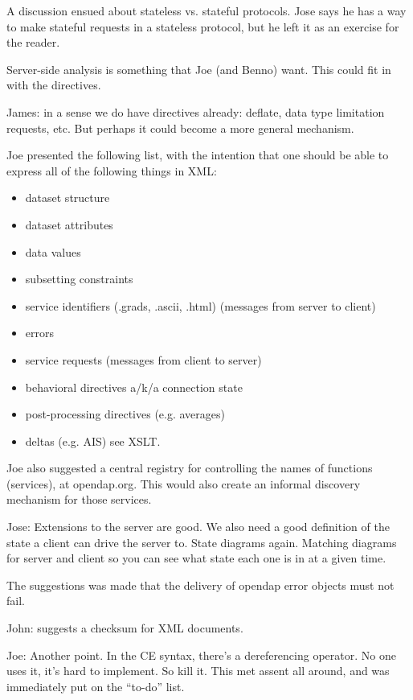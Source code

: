 A discussion ensued about stateless vs. stateful protocols.  Jose says
he has a way to make stateful requests in a stateless protocol, but he
left it as an exercise for the reader.

Server-side analysis is something that Joe (and Benno) want.  This
could fit in with the directives.

James: in a sense we do have directives already: deflate, data type
limitation requests, etc.  But perhaps it could become a more general
mechanism. 

Joe presented the following list, with the intention that one
should be able to express all of the following things in XML:

\begin{itemize}
\item dataset structure
\item dataset attributes
\item data values
\item subsetting constraints
\item service identifiers (.grads, .ascii, .html)  (messages from
  server to client)
\item errors
\item service requests (messages from client to server)
\item behavioral directives a/k/a connection state
\item post-processing directives (e.g. averages)
\item deltas (e.g. AIS)  see XSLT.
\end{itemize}

Joe also suggested a central registry for controlling the names of
functions (services), at opendap.org.  This would also create an
informal discovery mechanism for those services.

Jose: Extensions to the server are good.  We also need a good
definition of the state a client can drive the server to.  State
diagrams again.  Matching diagrams for server and client so you can
see what state each one is in at a given time.

The suggestions was made that the delivery of opendap error objects
must not fail. 

John: suggests a checksum for XML documents.

Joe: Another point.  In the CE syntax, there's a dereferencing
operator.  No one uses it, it's hard to implement.  So kill it.  This
met assent all around, and was immediately put on the ``to-do'' list.

